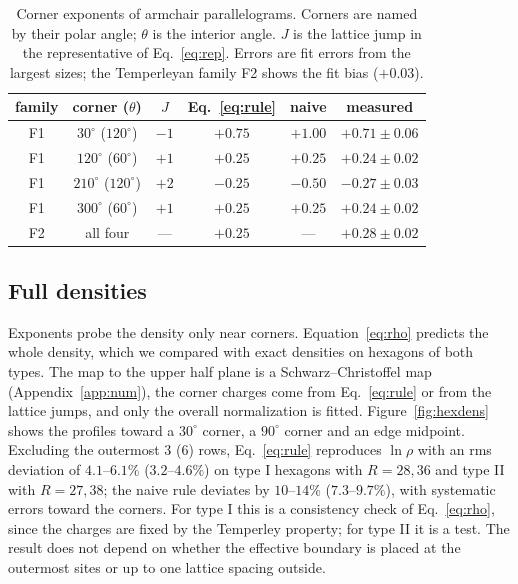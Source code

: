 \documentclass[aps,pre,twocolumn,superscriptaddress,nofootinbib,floatfix]{revtex4-2}
\begin{document}
\begin{table}[t]
\caption{Corner exponents of armchair parallelograms. Corners are named by their polar angle; $\theta$ is the interior angle. $J$ is the lattice jump in the representative of Eq.~\eqref{eq:rep}. Errors are fit errors from the largest sizes; the Temperleyan family F2 shows the fit bias ($+0.03$).}
\label{tab:para}
\begin{ruledtabular}
\begin{tabular}{cccccc}
family & corner ($\theta$) & $J$ & Eq.~\eqref{eq:rule} & naive & measured\\ \hline
F1 & $30^\circ$ ($120^\circ$) & $-1$ & $+0.75$ & $+1.00$ & $+0.71\pm0.06$\\
F1 & $120^\circ$ ($60^\circ$) & $+1$ & $+0.25$ & $+0.25$ & $+0.24\pm0.02$\\
F1 & $210^\circ$ ($120^\circ$) & $+2$ & $-0.25$ & $-0.50$ & $-0.27\pm0.03$\\
F1 & $300^\circ$ ($60^\circ$) & $+1$ & $+0.25$ & $+0.25$ & $+0.24\pm0.02$\\
F2 & all four & --- & $+0.25$ & --- & $+0.28\pm0.02$\\
\end{tabular}
\end{ruledtabular}
\end{table}

\subsection{Full densities}
Exponents probe the density only near corners. Equation~\eqref{eq:rho} predicts the whole density, which we compared with exact densities on hexagons of both types. The map to the upper half plane is a Schwarz--Christoffel map (Appendix~\ref{app:num}), the corner charges come from Eq.~\eqref{eq:rule} or from the lattice jumps, and only the overall normalization is fitted. Figure~\ref{fig:hexdens} shows the profiles toward a $30^\circ$ corner, a $90^\circ$ corner and an edge midpoint. Excluding the outermost $3$ ($6$) rows, Eq.~\eqref{eq:rule} reproduces $\ln\rho$ with an rms deviation of $4.1$--$6.1\%$ ($3.2$--$4.6\%$) on type I hexagons with $R=28,36$ and type II with $R=27,38$; the naive rule deviates by $10$--$14\%$ ($7.3$--$9.7\%$), with systematic errors toward the corners. For type I this is a consistency check of Eq.~\eqref{eq:rho}, since the charges are fixed by the Temperley property; for type II it is a test. The result does not depend on whether the effective boundary is placed at the outermost sites or up to one lattice spacing outside.
\end{document}
